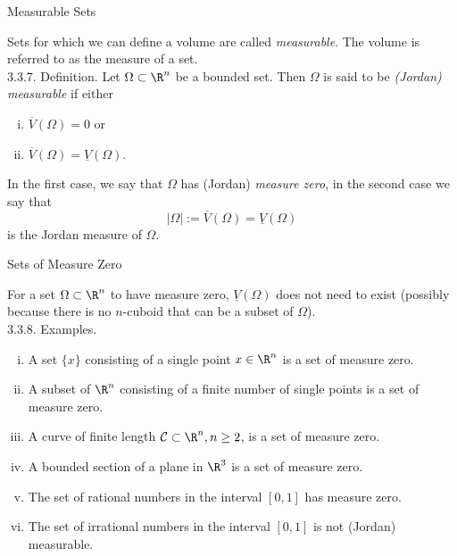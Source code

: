 \documentclass[smaller,hyperref={CJKbookmarks=true}]{beamer}
\begin{document}
\begin{frame}[c]{Measurable Sets}
\begin{spacing}{1.1}
Sets for which we can define a volume are called \emph{measurable}. The volume
is referred to as the measure of a set.\\[6pt]
\alert{3.3.7. Definition.} Let $\Omega\subset\R^n$ be a bounded set. Then $\Omega$ is said to be \emph{(Jordan) measurable} if either
\begin{enumerate}[(i)]
  \item $\overline{V}(\Omega)=0$ or
  \item $\overline{V}(\Omega)=\underline{V}
      (\Omega)$.
\end{enumerate}
In the first case, we say that $\Omega$ has (Jordan) \emph{measure zero}, in the second case we say that
\[|\Omega|:=\overline{V}(\Omega)=\underline{V}
(\Omega)\]
is the Jordan measure of $\Omega$.
\end{spacing}
\end{frame}
\begin{frame}[c]{Sets of Measure Zero}
\begin{spacing}{1.1}
For a set $\Omega\subset\R^n$ to have measure zero, $\underline{V}(\Omega)$ does not need to exist (possibly because there is no $n$-cuboid that can be a subset of $\Omega$).\\[5pt]
\alert{3.3.8. Examples.}
\begin{enumerate}[(i)]
  \item A set $\{x\}$ consisting of a single point $x\in\R^n$ is a set of measure zero.
  \item A subset of $\R^n$ consisting of a finite number of single points is a set of measure zero.
  \item A curve of finite length $\mathcal{C}\subset\R^n,n\geq2$, is a set of measure zero.
  \item A bounded section of a plane in $\R^3$ is a set of measure zero.
  \item The set of rational numbers in the interval $[0,1]$ has measure zero.
  \item The set of irrational numbers in the interval $[0,1]$ is not (Jordan) measurable.
\end{enumerate}
\end{spacing}
\end{frame}
\end{document}
